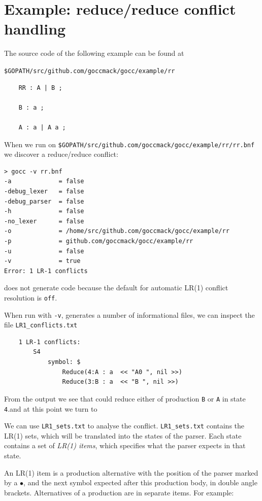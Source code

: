 \documentclass[12pt]{article}
\begin{document}
\section{Example: reduce/reduce conflict handling} \label{sec:example rr}
	The source code of the following example can be found at

	\verb|$GOPATH/src/github.com/goccmack/gocc/example/rr|

	\begin{verbatim}
	RR : A | B ;

	B : a ;

	A : a | A a ;

	\end{verbatim}

	When we run \gocc on \verb|$GOPATH/src/github.com/goccmack/gocc/example/rr/rr.bnf| we discover a reduce/reduce conflict:

	\begin{verbatim}
> gocc -v rr.bnf
-a             = false
-debug_lexer   = false
-debug_parser  = false
-h             = false
-no_lexer      = false
-o             = /home/src/github.com/goccmack/gocc/example/rr
-p             = github.com/goccmack/gocc/example/rr
-u             = false
-v             = true
Error: 1 LR-1 conflicts
	\end{verbatim}

	\gocc does not generate code because the default for automatic LR(1) conflict resolution is \verb|off|.  

	When run with \verb|-v|, \gocc generates a number of informational files, we can inspect the file \verb|LR1_conflicts.txt|
	
	\begin{verbatim}
	1 LR-1 conflicts: 
	    S4
	        symbol: $
	            Reduce(4:A : a	<< "A0 ", nil >>)
	            Reduce(3:B : a	<< "B ", nil >>)
	\end{verbatim}
	
	From the output we see that \gocc could reduce either of production \verb|B| or \verb|A| in state \verb|4|.and at this point we turn to

	We can use \verb|LR1_sets.txt| to analyse the conflict.	\verb|LR1_sets.txt| contains the LR(1) sets, which will be translated into the states of the parser. Each state contains a set of {\em LR(1)  items}, which specifies what the parser expects in that state.

	An LR(1) item is a production alternative with the position of the parser marked by a $\bullet$, and the next symbol expected after this production body, in double angle brackets. Alternatives of a production are in  separate items. For example:
\end{document}
